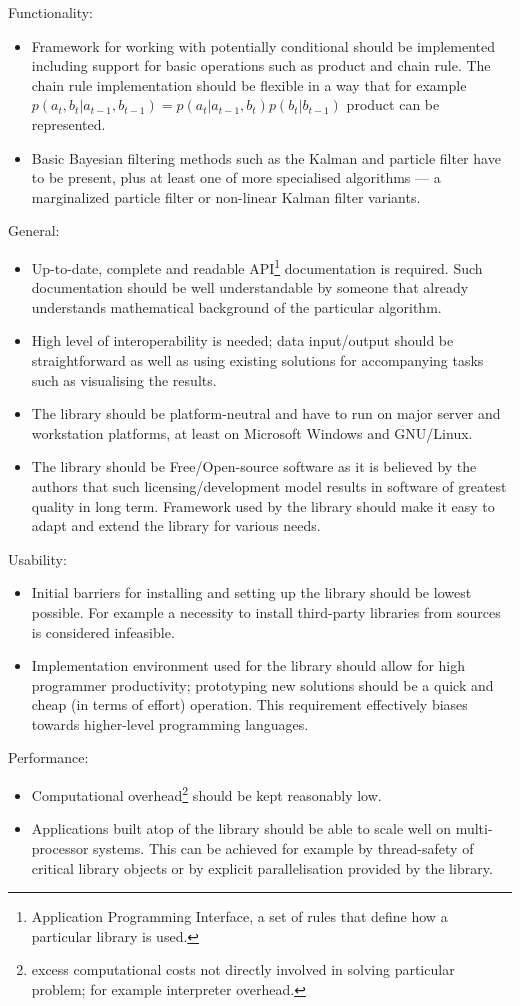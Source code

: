 \noindent Functionality:
\begin{itemize}
	\item Framework for working with potentially conditional {\pdfs} should be implemented
		including support for basic operations such as product and chain rule. The chain rule
		implementation should be flexible in a way that for example
		\(p(a_t,b_t|a_{t-1},b_{t-1}) = p(a_t|a_{t-1},b_t)p(b_t|b_{t-1})\) product can be
		represented.
	\item Basic Bayesian filtering methods such as the Kalman and particle filter have to be present,
		plus at least one of more specialised algorithms --- a marginalized particle filter or
		non-linear Kalman filter variants.
\end{itemize}
General:
\begin{itemize}
	\item Up-to-date, complete and readable API\footnote{Application Programming Interface, a set of
		rules that define how a particular library is used.} documentation is required. Such
		documentation should be well understandable by someone that already understands mathematical
		background of the particular algorithm.
	\item High level of interoperability is needed; data input/output should be straightforward as
		well as using existing solutions for accompanying tasks such as visualising the results.
	\item The library should be platform-neutral and have to run on major server and workstation
		platforms, at least on Microsoft Windows and GNU/Linux.
	\item The library should be Free/Open-source software as it is believed by the authors that such
		licensing/development model results in software of greatest quality in long term. Framework
		used by the library should make it easy to adapt and extend the library for various needs.
\end{itemize}
Usability:
\begin{itemize}
	\item Initial barriers for installing and setting up the library should be lowest possible.
		For example a necessity to install third-party libraries from sources is considered
		infeasible.
	\item Implementation environment used for the library should allow for high programmer
		productivity; prototyping new solutions should be a quick and cheap (in terms of effort)
		operation. This requirement effectively biases towards higher-level programming
		languages.
\end{itemize}
Performance:
\begin{itemize}
	\item Computational overhead\footnote{excess computational costs not directly involved
		in solving particular problem; for example interpreter overhead.} should be kept reasonably
		low.
	\item Applications built atop of the library should be able to scale well on multi-processor
		systems. This can be achieved for example by thread-safety of critical library objects
		or by explicit parallelisation provided by the library.
\end{itemize}

